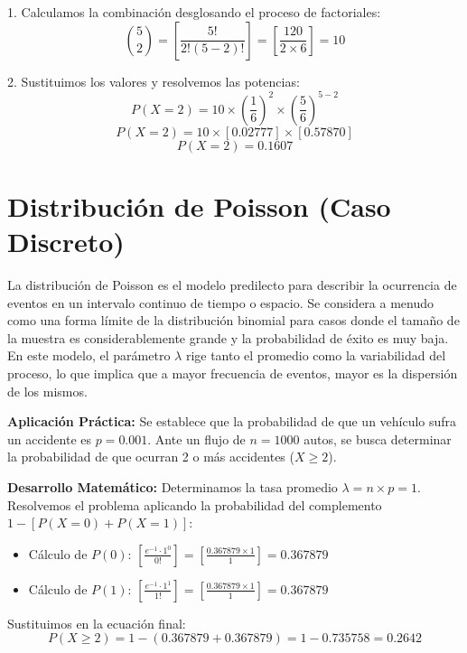 \documentclass[12pt,a4paper]{article}
\begin{document}
1. Calculamos la combinación desglosando el proceso de factoriales:
\[ \binom{5}{2} = \left[ \frac{5!}{2!(5-2)!} \right] = \left[ \frac{120}{2 \times 6} \right] = 10 \]

2. Sustituimos los valores y resolvemos las potencias:
\[ P(X=2) = 10 \times \left( \frac{1}{6} \right)^2 \times \left( \frac{5}{6} \right)^{5-2} \]
\[ P(X=2) = 10 \times [0.02777] \times [0.57870] \]
\[ P(X=2) = \mathbf{0.1607} \]

\newpage

\section{Distribución de Poisson (Caso Discreto)}

La distribución de Poisson es el modelo predilecto para describir la ocurrencia de eventos en un intervalo continuo de tiempo o espacio. Se considera a menudo como una forma límite de la distribución binomial para casos donde el tamaño de la muestra es considerablemente grande y la probabilidad de éxito es muy baja. En este modelo, el parámetro $\lambda$ rige tanto el promedio como la variabilidad del proceso, lo que implica que a mayor frecuencia de eventos, mayor es la dispersión de los mismos.

\vspace{0.4cm}
\textbf{Aplicación Práctica:} 
Se establece que la probabilidad de que un vehículo sufra un accidente es $p = 0.001$. Ante un flujo de $n = 1000$ autos, se busca determinar la probabilidad de que ocurran 2 o más accidentes ($X \ge 2$).

\vspace{0.4cm}
\textbf{Desarrollo Matemático:}
Determinamos la tasa promedio $\lambda = n \times p = 1$. Resolvemos el problema aplicando la probabilidad del complemento $1 - [P(X=0) + P(X=1)]$:

\begin{itemize}
    \item Cálculo de $P(0)$: $\left[ \frac{e^{-1} \cdot 1^0}{0!} \right] = \left[ \frac{0.367879 \times 1}{1} \right] = 0.367879$
    \item Cálculo de $P(1)$: $\left[ \frac{e^{-1} \cdot 1^1}{1!} \right] = \left[ \frac{0.367879 \times 1}{1} \right] = 0.367879$
\end{itemize}

Sustituimos en la ecuación final:
\[ P(X \ge 2) = 1 - (0.367879 + 0.367879) = 1 - 0.735758 = \mathbf{0.2642} \]
\end{document}
